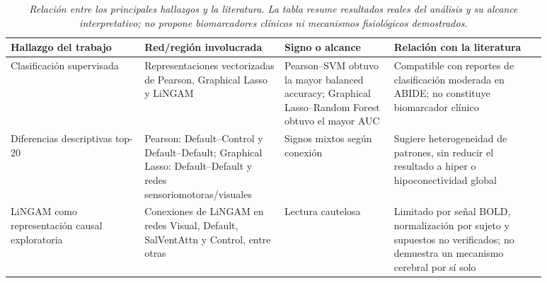 \documentclass[12pt,letterpaper]{article}
\begin{document}
\begin{table}[H]
\centering
\footnotesize
\setlength{\tabcolsep}{3pt}
\renewcommand{\arraystretch}{1.08}
\begin{tabular}{>{\raggedright\arraybackslash}p{0.22\linewidth} >{\raggedright\arraybackslash}p{0.23\linewidth} >{\raggedright\arraybackslash}p{0.18\linewidth} >{\raggedright\arraybackslash}p{0.25\linewidth}}
\toprule
Hallazgo del trabajo & Red/región involucrada & Signo o alcance & Relación con la literatura \\
\midrule
Clasificación supervisada & Representaciones vectorizadas de Pearson, Graphical Lasso y LiNGAM & Pearson--SVM obtuvo la mayor balanced accuracy; Graphical Lasso--Random Forest obtuvo el mayor AUC & Compatible con reportes de clasificación moderada en ABIDE; no constituye biomarcador clínico \\
Diferencias descriptivas top-20 & Pearson: Default--Control y Default--Default; Graphical Lasso: Default--Default y redes sensoriomotoras/visuales & Signos mixtos según conexión & Sugiere heterogeneidad de patrones, sin reducir el resultado a hiper o hipoconectividad global \\
LiNGAM como representación causal exploratoria & Conexiones de LiNGAM en redes Visual, Default, SalVentAttn y Control, entre otras & Lectura cautelosa & Limitado por señal BOLD, normalización por sujeto y supuestos no verificados; no demuestra un mecanismo cerebral por sí solo \\
\bottomrule
\end{tabular}
\caption{\textit{Relación entre los principales hallazgos y la literatura. La tabla resume resultados reales del análisis y su alcance interpretativo; no propone biomarcadores clínicos ni mecanismos fisiológicos demostrados.}}
\label{tab:hallazgos_literatura}
\end{table}
\end{document}
